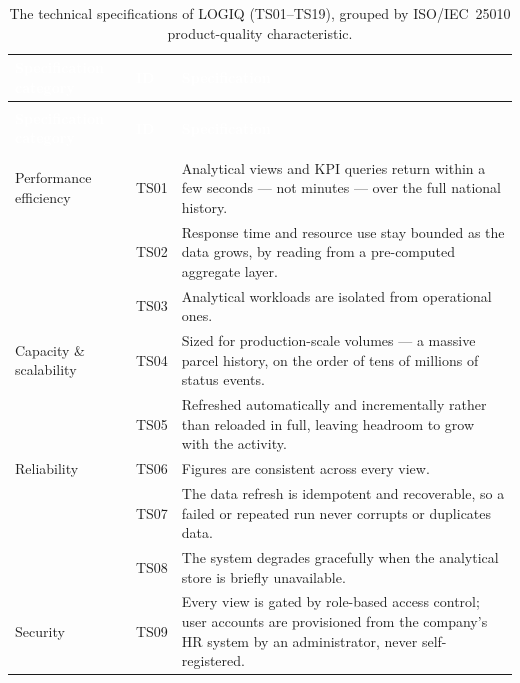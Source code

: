 \begin{xltabular}{\linewidth}{|>{\raggedright\arraybackslash}p{3.6cm}|>{\centering\arraybackslash}p{1.0cm}|>{\raggedright\arraybackslash}X|}
\caption{The technical specifications of LOGIQ (TS01--TS19), grouped by ISO/IEC~25010 product-quality
characteristic.}
\label{tab:ch4-techspec} \\
\hline
{}
\textcolor{white}{\textbf{Specification category}} & \textcolor{white}{\textbf{ID}} &
\textcolor{white}{\textbf{Specification}} \\
\hline
\endfirsthead
{}\\
\hline
{}
\textcolor{white}{\textbf{Specification category}} & \textcolor{white}{\textbf{ID}} &
\textcolor{white}{\textbf{Specification}} \\
\hline
\endhead
\hline
{}\\
\endfoot
\hline
\endlastfoot
Performance efficiency & TS01 &
Analytical views and KPI queries return within a few seconds --- not minutes --- over the full national history. \\
 & TS02 & Response time and resource use stay bounded as the data grows, by reading from a pre-computed aggregate layer. \\
 & TS03 & Analytical workloads are isolated from operational ones. \\
\hline
{} Capacity \& scalability & TS04 &
Sized for production-scale volumes --- a massive parcel history, on the order of tens of millions of status events. \\
 & TS05 & Refreshed automatically and incrementally rather than reloaded in full, leaving headroom to grow with the activity. \\
\hline
Reliability & TS06 &
Figures are consistent across every view. \\
 & TS07 & The data refresh is idempotent and recoverable, so a failed or repeated run never corrupts or duplicates data. \\
 & TS08 & The system degrades gracefully when the analytical store is briefly unavailable. \\
\hline
{} Security & TS09 &
Every view is gated by role-based access control; user accounts are provisioned from the company's HR system by an administrator, never self-registered. \\

\end{xltabular}
